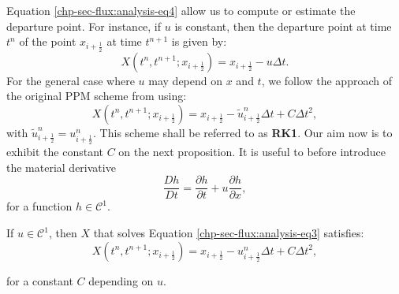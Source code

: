 Equation \eqref{chp-sec-flux:analysis-eq4} allow us to compute or estimate the departure point.
For instance, if $u$ is constant, then the departure point at time $t^n$ of the point 
$x_{i+\frac{1}{2}}$ at time $t^{n+1}$ is given by:
\begin{equation}
	\label{chp-sec-flux:departurepoint}
	X(t^n,t^{n+1};x_{i+\frac{1}{2}}) = x_{i+\frac{1}{2}} - u\Delta t.
\end{equation}
For the general case where $u$ may depend on $x$ and $t$, we follow the approach of
the original PPM scheme from \citet{colella:1984} using:
\begin{equation}
	\label{chp-sec-flux:departurepoint3}
	X(t^n,t^{n+1};x_{i+\frac{1}{2}}) = x_{i+\frac{1}{2}} - \tilde{u}^{n}_{i+\frac{1}{2}}\Delta t + C\Delta t^2,
\end{equation}
with $\tilde{u}^{n}_{i+\frac{1}{2}} = {u}^{n}_{i+\frac{1}{2}}$.
This scheme shall be referred to as \textbf{RK1}.
Our aim now is to exhibit the constant $C$ on the next proposition. It is useful to before introduce the material derivative
\begin{equation*}
	\frac{Dh}{Dt}  = \frac{\partial h}{\partial t} + u\frac{\partial h}{\partial x},
\end{equation*}
for a function $h \in \mathcal{C}^1$.
\begin{prop}
	\label{chp-sec-flux:dp_euler}
	If $u\in \mathcal{C}^1$, then $X$ that solves Equation \eqref{chp-sec-flux:analysis-eq3} satisfies:
	\begin{equation}
		X(t^n,t^{n+1};x_{i+\frac{1}{2}}) = x_{i+\frac{1}{2}} - {u}^{n}_{i+\frac{1}{2}}\Delta t + C\Delta t^2,
	\end{equation}
\end{prop}
for a constant $C$ depending on $u$.
